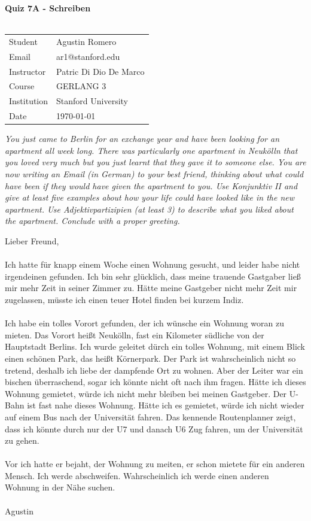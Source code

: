\documentclass{article}
\begin{document}
\begin{center}
\textbf{\Large{Quiz 7A - Schreiben}}\\~\\
\begin{tabular}{l l}
Student&Agustin Romero\\
Email&ar1@stanford.edu\\
Instructor&Patric Di Dio De Marco\\
Course&GERLANG 3\\
Institution&Stanford University\\
Date&\today\\
\end{tabular}
\end{center}
\textit{You just came to Berlin for an exchange year and have been looking for an apartment all week long. There was particularly one apartment in Neukölln that you loved very much but you just learnt that they gave it to someone else. You are now writing an Email (in German) to your best friend, thinking about what could have been if they would have given the apartment to you. Use Konjunktiv II and give at least five examples about how your life could have looked like in the new apartment. Use Adjektivpartizipien (at least 3) to describe what you liked about the apartment. Conclude with a proper greeting.}

Lieber Freund,\\~\\
Ich hatte für knapp einem Woche einen Wohnung gesucht, und leider habe nicht irgendeinen gefunden. Ich bin sehr glücklich, dass meine trauende Gastgaber ließ mir mehr Zeit in seiner Zimmer zu. Hätte meine Gastgeber nicht mehr Zeit mir zugelassen, müsste ich einen teuer Hotel finden bei kurzem Indiz.\\~\\
Ich habe ein tolles Vorort gefunden, der ich wünsche ein Wohnung woran zu mieten. Das Vorort heißt Neukölln, fast ein Kilometer südliche von der Hauptstadt Berlins. Ich wurde geleitet dürch ein tolles Wohnung, mit einem Blick einen schönen Park, das heißt Körnerpark. Der Park ist wahrscheinlich nicht so tretend, deshalb ich liebe der dampfende Ort zu wohnen. Aber der Leiter war ein bischen überraschend, sogar ich könnte nicht oft nach ihm fragen. Hätte ich dieses Wohnung gemietet, würde ich nicht mehr bleiben bei meinen Gastgeber. Der U-Bahn ist fast nahe dieses Wohnung. Hätte ich es gemietet, würde ich nicht wieder auf einem Bus nach der Universität fahren. Das kennende Routenplanner zeigt, dass ich könnte durch nur der U7 und danach U6 Zug fahren, um der Universität zu gehen.\\~\\
Vor ich hatte er bejaht, der Wohnung zu meiten, er schon mietete für ein anderen Mensch. Ich werde abschweifen. Wahrscheinlich ich werde einen anderen Wohnung in der Nähe suchen.\\~\\
Agustin
\end{document}

